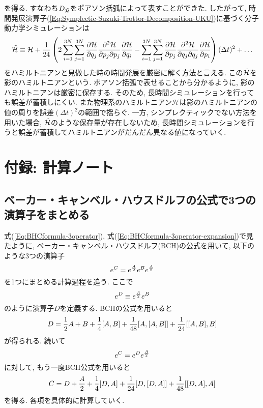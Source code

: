 を得る. すなわち$D_{\Tilde{\mathcal{H}}}$をポアソン括弧によって表すことができた.
したがって, 時間発展演算子(\ref{Eq:Symplectic-Suzuki-Trottor-Decomposition-UKU})に基づく分子動力学シミュレーションは
\begin{align}
  \Tilde{\mathcal{H}}
  \equiv
  \mathcal{H}
  +
  \frac{1}{24}
    \left(
      2
      \sum_{i=1}^{3N} \sum_{j=1}^{3N}
      \frac{\partial \mathcal{H}}{\partial q_{j}}
      \frac{\partial^{2} \mathcal{H}}{\partial p_{j} \partial p_{j}}
      \frac{\partial \mathcal{H}}{\partial q_{i}}
    -
      \sum_{i=1}^{3N} \sum_{j=1}^{3N}
      \frac{\partial \mathcal{H}}{\partial p_{j}}
      \frac{\partial^{2} \mathcal{H}}{\partial q_{j} \partial q_{j}}
      \frac{\partial \mathcal{H}}{\partial p_{i}}
    \right)
    (\Delta t)^{2}
    + \ldots
\end{align}
をハミルトニアンと見做した時の時間発展を厳密に解く方法と言える.
この$\Tilde{\mathcal{H}}$を影のハミルトニアンという.
ポアソン括弧で表せることから分かるように, 影のハミルトニアンは厳密に保存する.
そのため, 長時間シミュレーションを行っても誤差が蓄積しにくい.
また物理系のハミルトニアン$\mathcal{H}$は影のハミルトニアンの値の周りを誤差$(\Delta t)^2$の範囲で揺らぐ.
一方, シンプレクティックでない方法を用いた場合, $\Tilde{\mathcal{H}}$のような保存量が存在しないため, 長時間シミュレーションを行うと誤差が蓄積してハミルトニアンがだんだん異なる値になっていく.

\clearpage

\section{付録: 計算ノート}
\subsection{ベーカー・キャンベル・ハウスドルフの公式で3つの演算子をまとめる}
式(\ref{Eq:BHCformula-3operator}), 式(\ref{Eq:BHCformula-3operator-expansion})で見たように, ベーカー・キャンベル・ハウスドルフ(BCH)の公式を用いて, 以下のような3つの演算子
\begin{equation}
  e^{C} = e^{\frac{A}{2}} e^{B} e^{\frac{A}{2}}
  \notag
\end{equation}
を1つにまとめる計算過程を追う.
ここで
\begin{equation}
  e^{D} \equiv e^{\frac{A}{2}} e^{B}
  \notag
\end{equation}
のように演算子$D$を定義する.
BCHの公式を用いると
\begin{equation}
  D = \frac{1}{2}A + B
    + \frac{1}{4}[A, B]
    + \frac{1}{48}[A, [A,B]]
    + \frac{1}{24}[[A, B], B]
  \notag
\end{equation}
が得られる. 続いて
\begin{equation}
  e^{C} = e^{D} e^{\frac{A}{2}}
  \notag
\end{equation}
に対して, もう一度BCH公式を用いると
\begin{equation}
  C = D + \frac{A}{2}
    + \frac{1}{4}[D, A]
    + \frac{1}{24}[D, [D, A]]
    + \frac{1}{48}[[D, A], A]
  \notag
\end{equation}
を得る. 各項を具体的に計算していく.

